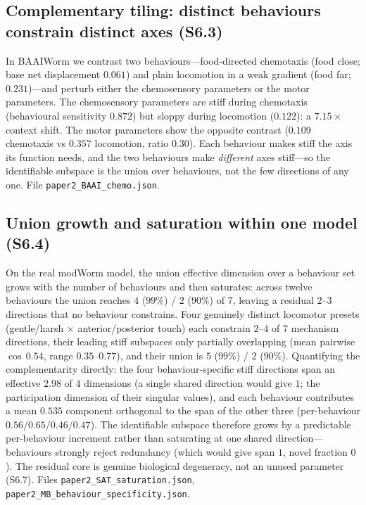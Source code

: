 \documentclass[11pt]{article}
\begin{document}
\subsection{Complementary tiling: distinct behaviours constrain distinct axes (S6.3)}
In BAAIWorm we contrast two behaviours---food-directed chemotaxis (food close; base net displacement $0.061$) and plain locomotion in a weak gradient (food far; $0.231$)---and perturb either the chemosensory parameters or the motor parameters. The chemosensory parameters are stiff during chemotaxis (behavioural sensitivity $0.872$) but sloppy during locomotion ($0.122$): a $7.15\times$ context shift. The motor parameters show the opposite contrast ($0.109$ chemotaxis vs $0.357$ locomotion, ratio $0.30$). Each behaviour makes stiff the axis its function needs, and the two behaviours make \emph{different} axes stiff---so the identifiable subspace is the union over behaviours, not the few directions of any one. File \texttt{paper2\_BAAI\_chemo.json}.

\subsection{Union growth and saturation within one model (S6.4)}
On the real modWorm model, the union effective dimension over a behaviour set grows with the number of behaviours and then saturates: across twelve behaviours the union reaches $4$ ($99\%$) / $2$ ($90\%$) of $7$, leaving a residual $2$--$3$ directions that no behaviour constrains. Four genuinely distinct locomotor presets (gentle/harsh $\times$ anterior/posterior touch) each constrain $2$--$4$ of $7$ mechanism directions, their leading stiff subspaces only partially overlapping (mean pairwise $\cos\,0.54$, range $0.35$--$0.77$), and their union is $5$ ($99\%$) / $2$ ($90\%$). Quantifying the complementarity directly: the four behaviour-specific stiff directions span an effective $2.98$ of $4$ dimensions (a single shared direction would give $1$; the participation dimension of their singular values), and each behaviour contributes a mean $0.535$ component orthogonal to the span of the other three (per-behaviour $0.56$/$0.65$/$0.46$/$0.47$). The identifiable subspace therefore grows by a predictable per-behaviour increment rather than saturating at one shared direction---behaviours strongly reject redundancy (which would give span $1$, novel fraction $0$). The residual core is genuine biological degeneracy, not an unused parameter (S6.7). Files \texttt{paper2\_SAT\_saturation.json}, \texttt{paper2\_MB\_behaviour\_specificity.json}.
\end{document}
